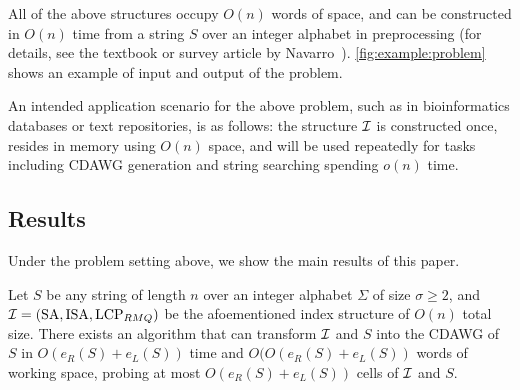 All of the above structures occupy $O(n)$ words of space, and can be constructed in $O(n)$ time from a string $S$ over an integer alphabet in preprocessing (for details, see the textbook or survey article by Navarro~\cite{navarro2016cds:book,navarro2021indexing:ii}).
\cref{fig:example:problem} shows an example of input and output of the problem.

An intended application scenario for the above problem, such as in bioinformatics databases or text repositories, is as follows: the structure $\mathcal{I}$ is constructed once, resides in memory using $O(n)$ space, and will be used repeatedly for tasks including CDAWG generation and string searching spending $o(n)$ time. 







\subsection{Results}
Under the problem setting above, we show the main results of this paper. 

\begin{theorem}\label{thm:main:index:cdawg}
  Let $S$ be any string of length $n$ over an integer alphabet $\Sigma$ of size $\sigma \ge 2$, and
  $\mathcal{I} = (\mathrm{SA}, \mathrm{ISA}, \mathrm{LCP}_{RMQ})$ be the afoementioned index structure of $O(n)$ total size. 
  There exists an algorithm that can transform $\mathcal{I}$ and
  $S$ into the CDAWG of $S$
  in $O(e_R(S) + e_L(S))$ time
  and 
  $O(O(e_R(S) + e_L(S))$ words of working space,
  probing at most $O(e_R(S) + e_L(S))$ cells of $\mathcal{I}$ and $S$. 
\end{theorem}

